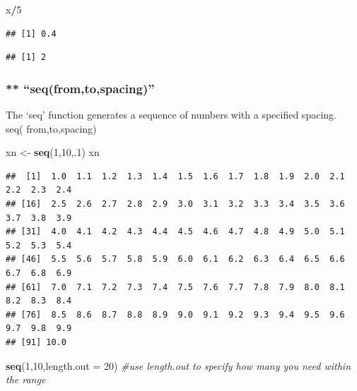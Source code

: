 \documentclass[]{article}
\newenvironment{Shaded}{\begin{snugshade}}{\end{snugshade}}
\newcommand{\CommentTok}[1]{\textcolor[rgb]{0.56,0.35,0.01}{\textit{#1}}}
\newcommand{\DataTypeTok}[1]{\textcolor[rgb]{0.13,0.29,0.53}{#1}}
\newcommand{\DecValTok}[1]{\textcolor[rgb]{0.00,0.00,0.81}{#1}}
\newcommand{\KeywordTok}[1]{\textcolor[rgb]{0.13,0.29,0.53}{\textbf{#1}}}
\newcommand{\NormalTok}[1]{#1}
\newcommand{\OperatorTok}[1]{\textcolor[rgb]{0.81,0.36,0.00}{\textbf{#1}}}
\newcommand{\StringTok}[1]{\textcolor[rgb]{0.31,0.60,0.02}{#1}}
\begin{document}
\begin{Shaded}
\begin{Highlighting}[]
\NormalTok{x}\OperatorTok{/}\DecValTok{5}
\end{Highlighting}
\end{Shaded}

\begin{verbatim}
## [1] 0.4
\end{verbatim}

\begin{Shaded}
\end{Shaded}

\begin{verbatim}
## [1] 2
\end{verbatim}

\hypertarget{seqfromtospacing}{%
\subsubsection{** ``seq(from,to,spacing)''}\label{seqfromtospacing}}

The `seq' function generates a sequence of numbers with a specified
spacing.\\
seq( from,to,spacing)

\begin{Shaded}
\begin{Highlighting}[]
\NormalTok{xn <-}\StringTok{ }\KeywordTok{seq}\NormalTok{(}\DecValTok{1}\NormalTok{,}\DecValTok{10}\NormalTok{,.}\DecValTok{1}\NormalTok{)}
\NormalTok{xn}
\end{Highlighting}
\end{Shaded}

\begin{verbatim}
##  [1]  1.0  1.1  1.2  1.3  1.4  1.5  1.6  1.7  1.8  1.9  2.0  2.1  2.2  2.3  2.4
## [16]  2.5  2.6  2.7  2.8  2.9  3.0  3.1  3.2  3.3  3.4  3.5  3.6  3.7  3.8  3.9
## [31]  4.0  4.1  4.2  4.3  4.4  4.5  4.6  4.7  4.8  4.9  5.0  5.1  5.2  5.3  5.4
## [46]  5.5  5.6  5.7  5.8  5.9  6.0  6.1  6.2  6.3  6.4  6.5  6.6  6.7  6.8  6.9
## [61]  7.0  7.1  7.2  7.3  7.4  7.5  7.6  7.7  7.8  7.9  8.0  8.1  8.2  8.3  8.4
## [76]  8.5  8.6  8.7  8.8  8.9  9.0  9.1  9.2  9.3  9.4  9.5  9.6  9.7  9.8  9.9
## [91] 10.0
\end{verbatim}

\begin{Shaded}
\begin{Highlighting}[]
\KeywordTok{seq}\NormalTok{(}\DecValTok{1}\NormalTok{,}\DecValTok{10}\NormalTok{,}\DataTypeTok{length.out =} \DecValTok{20}\NormalTok{) }\CommentTok{#use length.out to specify how many you need within the range}
\end{Highlighting}
\end{Shaded}
\end{document}
